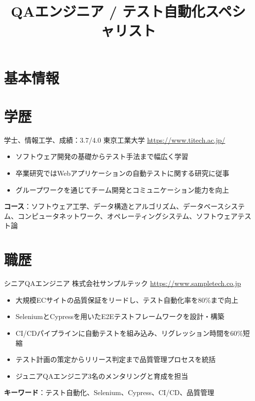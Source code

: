 \documentclass[a4paper, serif, 10pt]{moderncv}
\title{QAエンジニア / テスト自動化スペシャリスト}
\begin{document}
\maketitle

\section{基本情報}

\section{学歴}

        {学士、情報工学、成績：3.7/4.0}
        {東京工業大学}
        {\url{https://www.titech.ac.jp/}}
        {}
        {\begin{itemize}
\item ソフトウェア開発の基礎からテスト手法まで幅広く学習
\item 卒業研究ではWebアプリケーションの自動テストに関する研究に従事
\item グループワークを通じてチーム開発とコミュニケーション能力を向上
\end{itemize}
\textbf{コース}：ソフトウェア工学、データ構造とアルゴリズム、データベースシステム、コンピュータネットワーク、オペレーティングシステム、ソフトウェアテスト論}
\section{職歴}

        {シニアQAエンジニア}
        {株式会社サンプルテック}
        {\url{https://www.sampletech.co.jp}}
        {}
        {\begin{itemize}
\item 大規模ECサイトの品質保証をリードし、テスト自動化率を80\%まで向上
\item SeleniumとCypressを用いたE2Eテストフレームワークを設計・構築
\item CI/CDパイプラインに自動テストを組み込み、リグレッション時間を60\%短縮
\item テスト計画の策定からリリース判定まで品質管理プロセスを統括
\item ジュニアQAエンジニア3名のメンタリングと育成を担当
\end{itemize}
\textbf{キーワード}：テスト自動化、Selenium、Cypress、CI/CD、品質管理}
\end{document}
